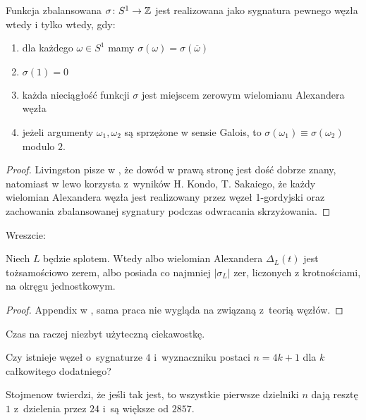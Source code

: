 \begin{proposition}
    Funkcja zbalansowana $\sigma \colon S^1 \to \mathbb Z$ jest realizowana jako sygnatura pewnego węzła wtedy i tylko wtedy, gdy:
    \begin{enumerate}
        \item dla każdego $\omega \in S^1$ mamy $\sigma(\omega) = \sigma(\overline{\omega})$
        \item $\sigma(1) = 0$
        \item każda nieciągłość funkcji $\sigma$ jest miejscem zerowym wielomianu Alexandera węzła
        \item jeżeli argumenty $\omega_1, \omega_2$ są sprzężone w sensie Galois, to $\sigma(\omega_1) \equiv \sigma(\omega_2)$ modulo $2$.
    \end{enumerate}
\end{proposition}

\begin{proof}
    Livingston pisze w \cite{livingston18}, że dowód w prawą stronę jest dość dobrze znany, natomiast w lewo korzysta z~wyników H. Kondo, T. Sakaiego, że każdy wielomian Alexandera węzła jest realizowany przez węzeł 1-gordyjski oraz zachowania zbalansowanej sygnatury podczas odwracania skrzyżowania.
\end{proof}

Wreszcie:

\begin{proposition}
    Niech $L$ będzie splotem.
    Wtedy albo wielomian Alexandera $\Delta_L(t)$ jest tożsamościowo zerem, albo posiada co najmniej $|\sigma_L|$ zer, liczonych z krotnościami, na okręgu jednostkowym.
\end{proposition}

\begin{proof}
    Appendix w \cite{liechti16}, sama praca nie wygląda na związaną z~teorią węzłów.
\end{proof}

Czas na raczej niezbyt użyteczną ciekawostkę.

\begin{conjecture}
    Czy istnieje węzeł o~sygnaturze $4$ i~wyznaczniku postaci $n = 4k + 1$ dla $k$ całkowitego dodatniego?
\end{conjecture}

Stojmenow twierdzi, że jeśli tak jest, to wszystkie pierwsze dzielniki $n$ dają resztę $1$ z~dzielenia przez $24$ i~są większe od $2857$.

